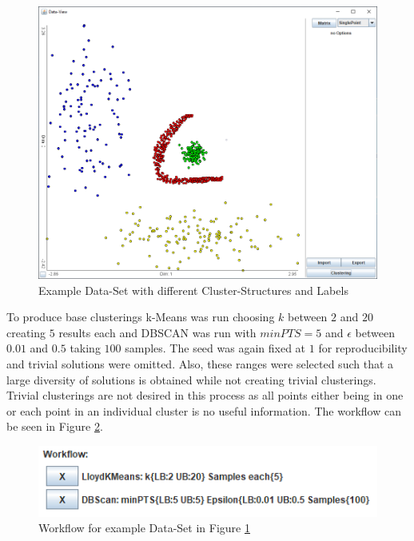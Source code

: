 \documentclass[
	a4paper,
	english,
	twoside,
	openright,               
	11pt                            
	]{report}
\begin{document}
\begin{figure}[h]
	\centering
	\includegraphics[scale=.4]{unob}
	\caption{Example Data-Set with different Cluster-Structures and Labels}
	\label{fig:unob}
\end{figure}

To produce base clusterings k-Means was run choosing $k$ between $2$ and $20$ creating $5$ results each and DBSCAN was run with $minPTS=5$ and $\epsilon$ between $0.01$ and $0.5$ taking $100$ samples. The seed was again fixed at $1$  for reproducibility and trivial solutions were omitted. Also, these ranges were selected such that a large diversity of solutions is obtained while not creating trivial clusterings. Trivial clusterings are not desired in this process as all points either being in one or each point in an individual cluster is no useful information. The workflow can be seen in Figure \ref{fig:unob_wf}.

\begin{figure}[h]
	\centering
	\includegraphics[scale=.75]{unob_wf}
	\caption{Workflow for example Data-Set in Figure \ref{fig:unob}}
	\label{fig:unob_wf}
\end{figure}
\end{document}
